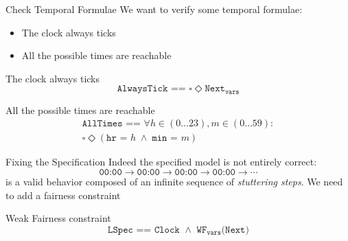 \begin{frame}{Check Temporal Formulae}
    We want to verify some temporal formulae:
    \begin{itemize}
        \item The clock always ticks
        \item All the possible times are reachable
    \end{itemize}
    \pause
    \begin{block}{The clock always ticks}
        \[
            \texttt{AlwaysTick == } \square \Diamond \texttt{Next}_{\texttt{vars}}
        \]
    \end{block}
    \pause
    \begin{block}{All the possible times are reachable}
        \begin{equation*}
            \begin{gathered}
                \texttt{AllTimes == } \forall h \in (0 \ldots 23), m \in (0 \ldots 59):\\
                \square \Diamond (\texttt{hr = } h\; \land\; \texttt{min = } m)
            \end{gathered}
        \end{equation*}
    \end{block}
\end{frame}

\begin{frame}{Fixing the Specification}
    Indeed the specified model is not entirely correct:
    \[
        \texttt{00:00} \rightarrow \texttt{00:00} \rightarrow \texttt{00:00} \rightarrow \texttt{00:00} \rightarrow \cdots
    \]
    is a valid behavior composed of an infinite sequence of \emph{stuttering steps}.
    \pause
    We need to add a fairness constraint
    \begin{block}{Weak Fairness constraint}
        \[
            \texttt{LSpec == Clock } \land \texttt{ WF}_{\texttt{vars}}\texttt{(Next)}
        \]
    \end{block}
\end{frame}
